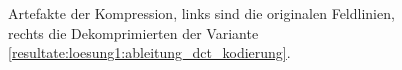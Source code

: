 \begin{figure}[!htbp]
	\center
	\caption{Artefakte der Kompression, links sind die originalen Feldlinien, rechts die Dekomprimierten der Variante \ref{resultate:loesung1:ableitung_dct_kodierung}.}
	\label{resultate:loesung1:dct:randbehandlung:jvhartefakte_loesung6}
\end{figure} 
